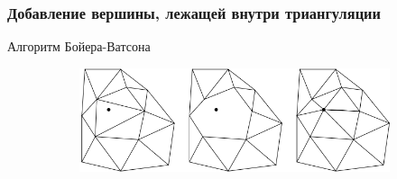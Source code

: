 \documentclass[10pt, unicode]{beamer}
\begin{document}
    \begin{frame}
        \frametitle{Добавление вершины, лежащей внутри триангуляции}
        Алгоритм Бойера-Ватсона
        \begin{figure}[H]
            \centering
            \begin{subfigure}{0.49\linewidth}
                \centering
                \includegraphics[scale=0.4, angle=-90]{BowyerWatson.png}
            \end{subfigure}
            \begin{subfigure}[l]{0.49\linewidth}

\end{subfigure}
\end{figure}
\end{frame}
\end{document}
